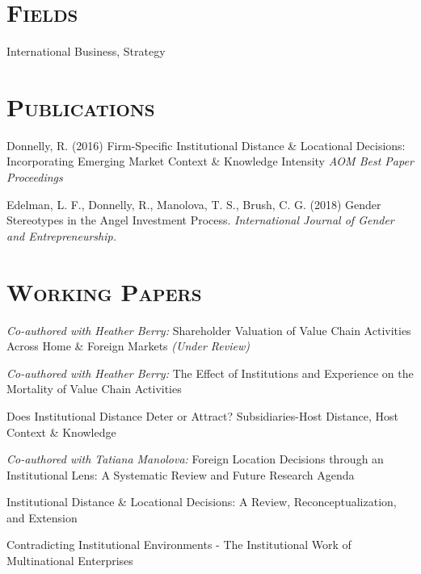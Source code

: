 \documentclass[margin, 12pt]{res}
\begin{document}
\begin{resume}
\section{\normalfont\textsc{Fields}}
International Business, Strategy


\section{\normalfont\textsc{Publications}}
Donnelly, R. (2016) Firm-Specific Institutional Distance \& Locational Decisions: Incorporating Emerging Market Context \& Knowledge Intensity  \textit{AOM  Best Paper Proceedings}

Edelman, L. F., Donnelly, R., Manolova, T. S., Brush, C. G. (2018) Gender Stereotypes in the Angel Investment Process. \textit{International Journal of Gender and Entrepreneurship.} 



\section{\normalfont\textsc{Working Papers}}


\textit{Co-authored with Heather Berry:} Shareholder Valuation of Value Chain Activities Across Home \& Foreign Markets \textit{(Under Review)}

\textit{Co-authored with Heather Berry:}  The Effect of Institutions and Experience on the Mortality of Value Chain Activities


Does Institutional Distance Deter or Attract? Subsidiaries-Host Distance, Host Context \& Knowledge	


\textit{Co-authored with Tatiana Manolova:} Foreign Location Decisions through an Institutional Lens: A Systematic Review and Future Research Agenda  


Institutional Distance \& Locational Decisions: A Review, Reconceptualization, and Extension 

Contradicting Institutional Environments - The Institutional Work of Multinational Enterprises 

\bigskip
\bigskip


\end{resume}
\end{document}
